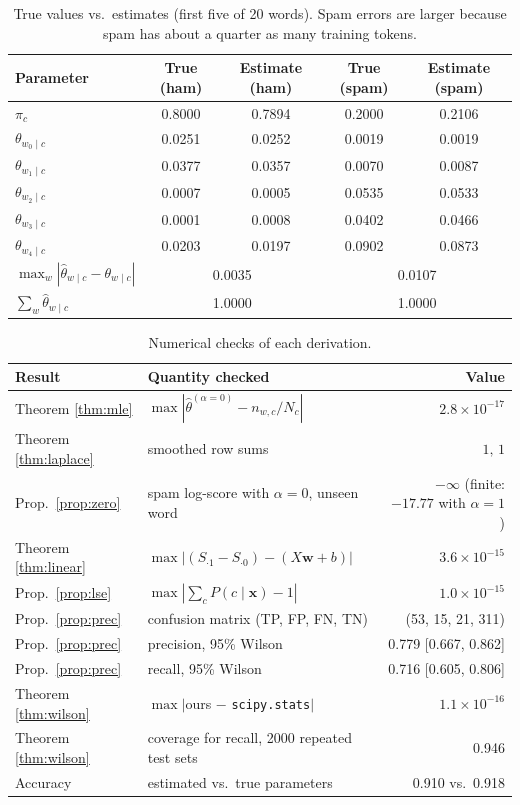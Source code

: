 \documentclass[11pt]{article}
\theoremstyle{plain}
\theoremstyle{definition}
\newcommand{\bx}{\mathbf{x}}
\newcommand{\bw}{\mathbf{w}}
\begin{document}
\begin{table}[htpb]
\centering
\small
\begin{tabular}{@{}lcccc@{}}
\toprule
Parameter & True (ham) & Estimate (ham) & True (spam) & Estimate (spam)\\
\midrule
$\pi_c$ & 0.8000 & 0.7894 & 0.2000 & 0.2106\\
$\theta_{w_0\mid c}$ & 0.0251 & 0.0252 & 0.0019 & 0.0019\\
$\theta_{w_1\mid c}$ & 0.0377 & 0.0357 & 0.0070 & 0.0087\\
$\theta_{w_2\mid c}$ & 0.0007 & 0.0005 & 0.0535 & 0.0533\\
$\theta_{w_3\mid c}$ & 0.0001 & 0.0008 & 0.0402 & 0.0466\\
$\theta_{w_4\mid c}$ & 0.0203 & 0.0197 & 0.0902 & 0.0873\\
$\max_w|\hat\theta_{w\mid c}-\theta_{w\mid c}|$ & \multicolumn{2}{c}{0.0035} & \multicolumn{2}{c}{0.0107}\\
$\sum_w\hat\theta_{w\mid c}$ & \multicolumn{2}{c}{1.0000} & \multicolumn{2}{c}{1.0000}\\
\bottomrule
\end{tabular}
\caption{True values vs.\ estimates (first five of 20 words). Spam errors are larger because spam
has about a quarter as many training tokens.}
\label{tab:sim}
\end{table}

\begin{table}[h]
\centering
\small
\begin{tabular}{@{}llr@{}}
\toprule
Result & Quantity checked & Value\\
\midrule
Theorem \ref{thm:mle} & $\max|\hat\theta^{(\alpha=0)}-n_{w,c}/N_c|$ & $2.8\times10^{-17}$\\
Theorem \ref{thm:laplace} & smoothed row sums & $1,\,1$\\
Prop.~\ref{prop:zero} & spam log-score with $\alpha=0$, unseen word & $-\infty$ (finite: $-17.77$ with $\alpha=1$)\\
Theorem \ref{thm:linear} & $\max|(S_{\cdot1}-S_{\cdot0})-(X\bw+b)|$ & $3.6\times10^{-15}$\\
Prop.~\ref{prop:lse} & $\max|\sum_cP(c\mid\bx)-1|$ & $1.0\times10^{-15}$\\
Prop.~\ref{prop:prec} & confusion matrix (TP, FP, FN, TN) & (53, 15, 21, 311)\\
Prop.~\ref{prop:prec} & precision, 95\% Wilson & 0.779 [0.667, 0.862]\\
Prop.~\ref{prop:prec} & recall, 95\% Wilson & 0.716 [0.605, 0.806]\\
Theorem \ref{thm:wilson} & $\max|$ours $-$ \texttt{scipy.stats}$|$ & $1.1\times10^{-16}$\\
Theorem \ref{thm:wilson} & coverage for recall, 2000 repeated test sets & 0.946\\
\midrule
Accuracy & estimated vs.\ true parameters & 0.910 vs.\ 0.918\\
\bottomrule
\end{tabular}
\caption{Numerical checks of each derivation.}
\label{tab:checks}
\end{table}
\end{document}
